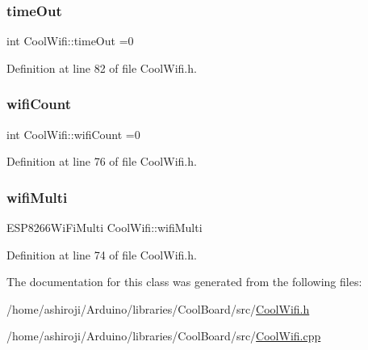 \subsubsection{\texorpdfstring{time\+Out}{timeOut}}
{\footnotesize\ttfamily int Cool\+Wifi\+::time\+Out =0\hspace{0.3cm}{\ttfamily [private]}}



Definition at line 82 of file Cool\+Wifi.\+h.

\mbox{\label{class_cool_wifi_ab133bd92fcb895b884deecd6678592e4}} 
\subsubsection{\texorpdfstring{wifi\+Count}{wifiCount}}
{\footnotesize\ttfamily int Cool\+Wifi\+::wifi\+Count =0\hspace{0.3cm}{\ttfamily [private]}}



Definition at line 76 of file Cool\+Wifi.\+h.

\mbox{\label{class_cool_wifi_a7862a8c0d7239877e2956c14a368aab8}} 
\subsubsection{\texorpdfstring{wifi\+Multi}{wifiMulti}}
{\footnotesize\ttfamily E\+S\+P8266\+Wi\+Fi\+Multi Cool\+Wifi\+::wifi\+Multi\hspace{0.3cm}{\ttfamily [private]}}



Definition at line 74 of file Cool\+Wifi.\+h.



The documentation for this class was generated from the following files\+:\begin{DoxyCompactItemize}
\item 
/home/ashiroji/\+Arduino/libraries/\+Cool\+Board/src/\hyperlink{_cool_wifi_8h}{Cool\+Wifi.\+h}\item 
/home/ashiroji/\+Arduino/libraries/\+Cool\+Board/src/\hyperlink{_cool_wifi_8cpp}{Cool\+Wifi.\+cpp}\end{DoxyCompactItemize}
